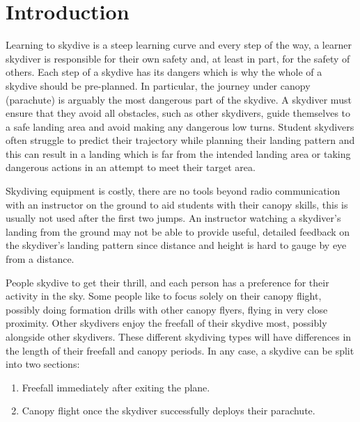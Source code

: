 \section{Introduction}\label{sec:introduction}
Learning to skydive is a steep learning curve and every step of the way, a learner skydiver is responsible for their own safety and, at least in part, for the safety of others. Each step of a skydive has its dangers which is why the whole of a skydive should be pre-planned. In particular, the journey under canopy (parachute) is arguably the most dangerous part of the skydive. A skydiver must ensure that they avoid all obstacles, such as other skydivers, guide themselves to a safe landing area and avoid making any dangerous low turns. Student skydivers often struggle to predict their trajectory while planning their landing pattern and this can result in a landing which is far from the intended landing area or taking dangerous actions in an attempt to meet their target area.

Skydiving equipment is costly, there are no tools beyond radio communication with an instructor on the ground to aid students with their canopy skills, this is usually not used after the first two jumps. An instructor watching a skydiver's landing from the ground may not be able to provide useful, detailed feedback on the skydiver's landing pattern since distance and height is hard to gauge by eye from a distance.

People skydive to get their thrill, and each person has a preference for their activity in the sky. Some people like to focus solely on their canopy flight, possibly doing formation drills with other canopy flyers, flying in very close proximity. Other skydivers enjoy the freefall of their skydive most, possibly alongside other skydivers. These different skydiving types will have differences in the length of their freefall and canopy periods.
In any case, a skydive can be split into two sections:
\begin{enumerate}
  \item Freefall immediately after exiting the plane.
  \item Canopy flight once the skydiver successfully deploys their parachute.
\end{enumerate}

